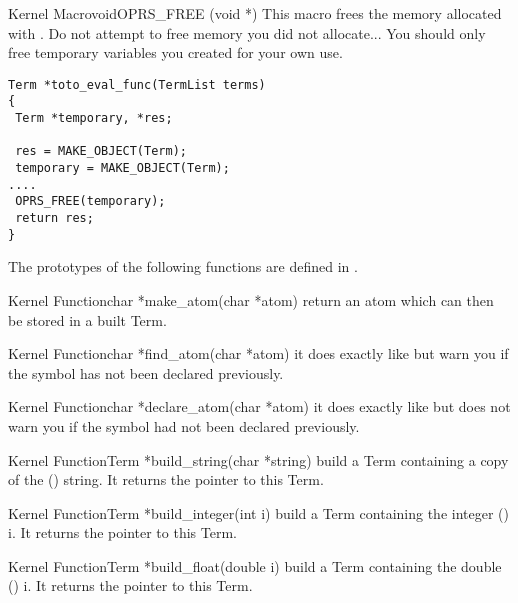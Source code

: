 \begin{typefn}{Kernel Macro}{void}{OPRS\_FREE} {(void *)}
This macro frees the memory allocated with .
 Do not attempt to free memory you did not allocate... You
should only free temporary variables you created for your own use.
\begin{verbatim}
Term *toto_eval_func(TermList terms)
{
 Term *temporary, *res;

 res = MAKE_OBJECT(Term);
 temporary = MAKE_OBJECT(Term);
....
 OPRS_FREE(temporary);
 return res;
}
\end{verbatim}
\end{typefn}

The prototypes of the following functions are defined in
.

\begin{typefn}{Kernel Function}{char *}{make\_atom}{(char *atom)}
return an atom which can then be stored in a built Term.
\end{typefn}

\begin{typefn}{Kernel Function}{char *}{find\_atom}{(char *atom)}
it does exactly like  but warn you if the symbol has not been
declared previously.
\end{typefn}

\begin{typefn}{Kernel Function}{char *}{declare\_atom}{(char *atom)}
it does exactly like  but does not warn you if the symbol had
not been declared previously.
\end{typefn}

\begin{typefn}{Kernel Function}{Term *}{build\_string}{(char *string)} build a Term
containing a copy of the () string. It returns the pointer to this
Term. 
\end{typefn}

\begin{typefn}{Kernel Function}{Term *}{build\_integer}{(int i)} build a Term
containing the integer () i. It returns the pointer to this Term.
\end{typefn}

\begin{typefn}{Kernel Function}{Term *}{build\_float}{(double i)} build a Term
containing the double () i. It returns the pointer to this Term.
\end{typefn}

